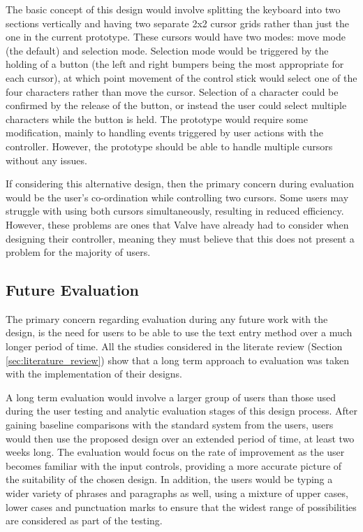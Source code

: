 \documentclass[future.tex]{subfiles}
\begin{document}
The basic concept of this design would involve splitting the keyboard into
two sections vertically and having two separate 2x2 cursor grids rather than
just the one in the current prototype. These cursors would have two modes: move
mode (the default) and selection mode. Selection mode would be triggered by the
holding of a button (the left and right bumpers being the most appropriate for
each cursor), at which point movement of the control stick would select one of
the four characters rather than move the cursor. Selection of a character could
be confirmed by the release of the button, or instead the user could select
multiple characters while the button is held. The prototype would require some
modification, mainly to handling events triggered by user actions with the
controller. However, the prototype should be able to handle multiple cursors
without any issues.

If considering this alternative design, then the primary concern during
evaluation would be the user's co-ordination while controlling two cursors.
Some users may struggle with using both cursors simultaneously, resulting in
reduced efficiency. However, these problems are ones that Valve have already had
to consider when designing their controller, meaning they must believe that this
does not present a problem for the majority of users.

\subsection{Future Evaluation} %
\label{sub:future_evaluation}
The primary concern regarding evaluation during any future work with the design,
is the need for users to be able to use the text entry method over a much longer
period of time. All the studies considered in the literate review (Section
\ref{sec:literature_review}) show that a long term approach to evaluation was
taken with the implementation of their designs.

A long term evaluation would involve a larger group of users than those used
during the user testing and analytic evaluation stages of this design process.
After gaining baseline comparisons with the standard system from the users,
users would then use the proposed design over an extended period of time, at
least two weeks long. The evaluation would focus on the rate of improvement as
the user becomes familiar with the input controls, providing a more accurate
picture of the suitability of the chosen design. In addition, the users would
be typing a wider variety of phrases and paragraphs as well, using a mixture of
upper cases, lower cases and punctuation marks to ensure that the widest range
of possibilities are considered as part of the testing.
\end{document}
